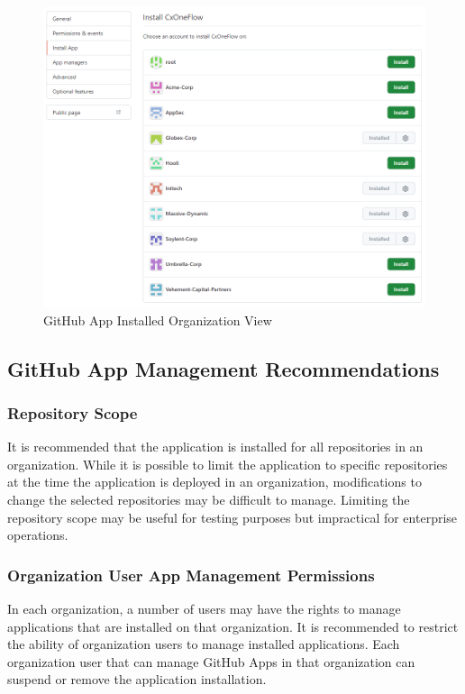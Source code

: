 \begin{figure}[ht]
    \includegraphics[width=\textwidth]{graphics/gh-app-deploy-4.png}
    \caption{GitHub App Installed Organization View}
    \label{fig:gh-app-deploy-4}
\end{figure}

\FloatBarrier

\subsection{GitHub App Management Recommendations}

\subsubsection{Repository Scope}

It is recommended that the application is installed for all repositories in an organization.  While it is possible to limit the
application to specific repositories at the time the application is deployed in an organization, modifications to change the
selected repositories may be difficult to manage.  Limiting the repository scope may be useful for testing purposes but impractical
for enterprise operations.

\subsubsection{Organization User App Management Permissions}

In each organization, a number of users may have the rights to manage applications that are installed on that organization.  It is
recommended to restrict the ability of organization users to manage installed applications.  Each organization user that can manage
GitHub Apps in that organization can suspend or remove the \cxoneflow application installation.

